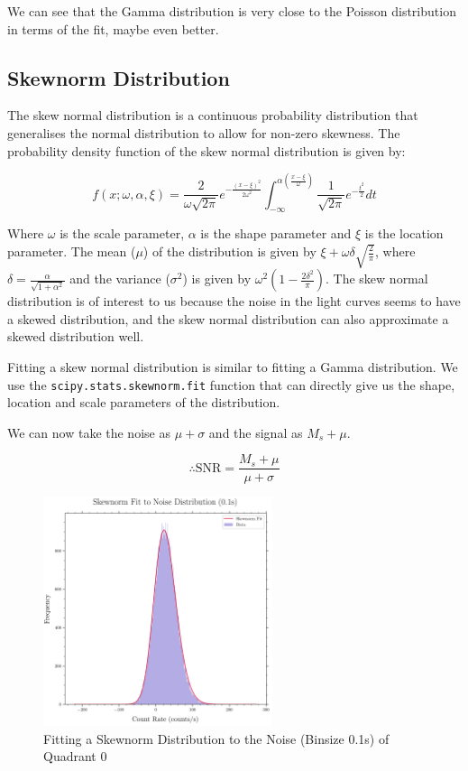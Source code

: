 \documentclass[11pt]{book} %
\begin{document}
We can see that the Gamma distribution is very close to the Poisson distribution in terms of the fit, maybe even better. 

\subsection{Skewnorm Distribution}

The skew normal distribution is a continuous probability distribution that generalises the normal distribution to allow for non-zero skewness. The probability density function of the skew normal distribution is given by:

\begin{equation} \label{eq:skewnorm}
    f(x; \omega, \alpha, \xi) = \dfrac{2}{\omega \sqrt{2 \pi}} e^{-\frac{(x-\xi)^2}{2\omega^2}} \int_{-\infty}^{\alpha \left(\frac{x-\xi}{\omega} \right)} \dfrac{1}{\sqrt{2 \pi}} e^{-\frac{t^2}{2}} dt
\end{equation}

Where $\omega$ is the scale parameter, $\alpha$ is the shape parameter and $\xi$ is the location parameter. The mean ($\mu$) of the distribution is given by $\xi + \omega \delta \sqrt{\frac{2}{\pi}}$, where $\delta = \frac{\alpha}{\sqrt{1+\alpha^2}}$ and the variance ($\sigma^2$) is given by $\omega^2 \left( 1 - \frac{2 \delta^2}{\pi} \right)$. The skew normal distribution is of interest to us because the noise in the light curves seems to have a skewed distribution, and the skew normal distribution can also approximate a skewed distribution well.

Fitting a skew normal distribution is similar to fitting a Gamma distribution. We use the \lstinline[language=Python]{scipy.stats.skewnorm.fit} function that can directly give us the shape, location and scale parameters of the distribution.

We can now take the noise as $\mu+\sigma$ and the signal as $M_s+\mu$.

\begin{equation}
    \therefore \text{SNR} = \frac{M_s+\mu}{\mu+\sigma}
\end{equation}

\begin{figure}[H]
    \centering
    \includegraphics[width=0.6\textwidth]{Pictures/skewnorm_fit.png}
    \caption{Fitting a Skewnorm Distribution to the Noise (Binsize 0.1s) of Quadrant 0}
\end{figure}
\end{document}
